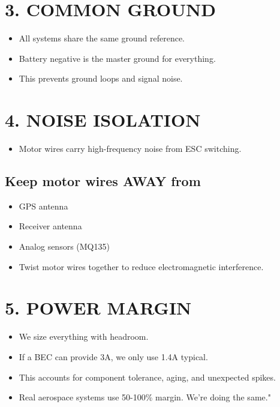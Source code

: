 \documentclass[11pt,letterpaper]{article}
\begin{document}
{\section{3. COMMON GROUND}

\begin{itemize}
  \item All systems share the same ground reference.
  \item Battery negative is the master ground for everything.
  \item This prevents ground loops and signal noise.
\end{itemize}

\section{4. NOISE ISOLATION}

\begin{itemize}
  \item Motor wires carry high-frequency noise from ESC switching.
\end{itemize}

\subsection{Keep motor wires AWAY from}

\begin{itemize}
  \item GPS antenna
  \item Receiver antenna
  \item Analog sensors (MQ135)
  \item Twist motor wires together to reduce electromagnetic interference.
\end{itemize}

\section{5. POWER MARGIN}

\begin{itemize}
  \item We size everything with headroom.
  \item If a BEC can provide 3A, we only use 1.4A typical.
  \item This accounts for component tolerance, aging, and unexpected spikes.
  \item Real aerospace systems use 50-100\% margin. We're doing the same."
\end{itemize}

}
\end{document}
